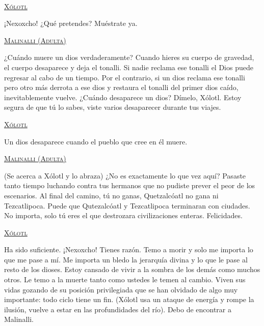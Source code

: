 \documentclass[11pt,letterpaper]{article}
\begin{document}
\begin{center}
\\
\par
 \textsc{\underline{Xólotl}}
\\
\par
¡Nexoxcho! ¿Qué pretendes? Muéstrate ya.
\\
\par
\textsc{\underline{Malinalli (Adulta)}}
\\
\par
¿Cuándo muere un dios verdaderamente? Cuando hieres su cuerpo de gravedad, el cuerpo desaparece y deja el tonalli. Si nadie reclama ese tonalli el Dios puede regresar al cabo de un tiempo. Por el contrario, si un dios reclama ese tonalli pero otro más derrota a ese dios y restaura el tonalli del primer dios caído, inevitablemente vuelve. ¿Cuándo desaparece un dios? Dímelo, Xólotl. Estoy segura de que tú lo sabes, viste varios desaparecer durante tus viajes.
\\
\par
\textsc{\underline{Xólotl}}
\\
\par
Un dios desaparece cuando el pueblo que cree en él muere.
\\
\par
\textsc{\underline{Malinalli (Adulta)}}
\\
\par
(Se acerca a Xólotl y lo abraza) ¿No es exactamente lo que vez aquí? Pasaste tanto tiempo luchando contra tus hermanos que no pudiste prever el peor de los escenarios. Al final del camino, tú no ganas, Quetzalcóatl no gana ni Tezcatlipoca. Puede que Qutezalcóatl y Tezcatlipoca terminaran con ciudades. No importa, solo tú eres el que destrozara civilizaciones enteras. Felicidades.
\\
\par
\textsc{\underline{Xólotl}}
\\
\par
Ha sido suficiente. ¡Nexoxcho! Tienes razón. Temo a morir y solo me importa lo que me pase a mí. Me importa un bledo la jerarquía divina y lo que le pase al resto de los dioses. Estoy cansado de vivir a la sombra de los demás como muchos otros. Le temo a la muerte tanto como ustedes le temen al cambio. Viven sus vidas gozando de su posición privilegiada que se han olvidado de algo muy importante: todo ciclo tiene un fin. (Xólotl usa un ataque de energía y rompe la ilusión, vuelve a estar en las profundidades del río). Debo de encontrar a Malinalli.  
\end{center}
\end{document}
